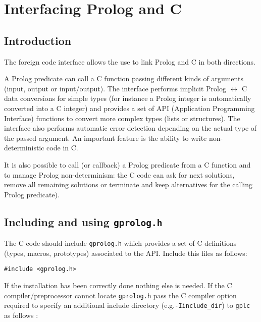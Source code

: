 \newpage
\section{Interfacing Prolog and C}
\label{Interfacing-Prolog-and-C}

\subsection{Introduction}

The foreign code interface allows the use to link Prolog and C in both
directions.

A Prolog predicate can call a C function passing different kinds of arguments
(input, output or input/output). The interface performs implicit Prolog
$\leftrightarrow$ C data conversions for simple types (for instance a Prolog
integer is automatically converted into a C integer) and provides a set of
API (Application Programming Interface) functions to convert more complex
types (lists or structures). The interface also performs automatic error
detection depending on the actual type of the passed argument. An important
feature is the ability to write non-deterministic code in C.

It is also possible to call (or callback) a Prolog predicate from a C
function and to manage Prolog non-determinism: the C code can ask for next
solutions, remove all remaining solutions or terminate and keep
alternatives for the calling Prolog predicate).

\subsection{Including and using \texttt{gprolog.h}}

The C code should include \texttt{gprolog.h} which provides a set of C
definitions (types, macros, prototypes) associated to the API. Include this
files as follows:

\begin{Indentation}
\begin{verbatim}
#include <gprolog.h>
\end{verbatim}
\end{Indentation}

If the installation has been correctly done nothing else is needed. If the C
compiler/preprocessor cannot locate \texttt{gprolog.h} pass the C compiler
option required to specify an additional include directory
(e.g.\texttt{-I}\texttt{include\_dir}) to \texttt{gplc} as follows
:

